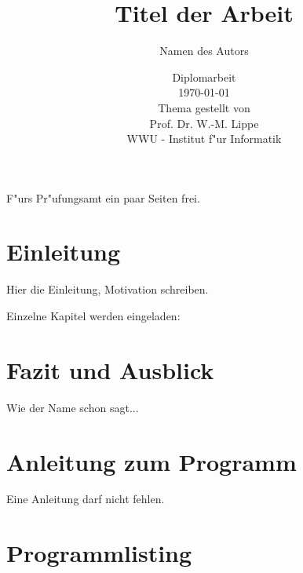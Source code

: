 \documentclass[12pt]{book}
\begin{document}
\frontmatter

\title{Titel der Arbeit}

\author{Namen des Autors}

\date{\vspace{10mm} Diplomarbeit\\ \vspace{3mm} \today \\
\vspace{20mm} Thema gestellt von\\ \vspace{3mm} Prof. Dr.
W.-M. Lippe\\ \vspace{3mm} WWU - Institut f"ur Informatik}

\maketitle


\rule{0mm}{1mm}
\newpage
\rule{0mm}{1mm}
\newpage

F"urs Pr"ufungsamt ein paar Seiten frei.

\tableofcontents


\chapter{Einleitung}

Hier die Einleitung, Motivation schreiben.


\mainmatter

Einzelne Kapitel werden eingeladen:



\newpage

\backmatter

\appendix

\chapter{Fazit und Ausblick}

Wie der Name schon sagt...


\chapter{Anleitung zum Programm}

Eine Anleitung darf nicht fehlen.

\chapter{Programmlisting}
\end{document}
